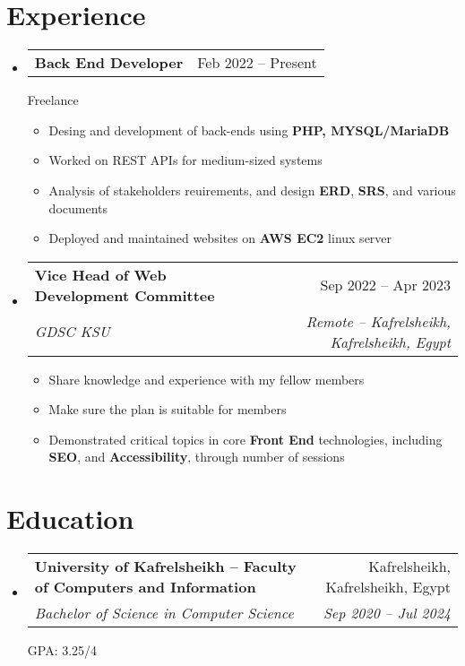 \documentclass[a4paper,11pt]{article}
\makeatletter
\newcommand{\resumeItem}[1]{
  \item\small{#1}
}
\newcommand{\resumeItemListStart}{\begin{itemize}[rightmargin=0.11in]}
\newcommand{\resumeItemListEnd}{\end{itemize}}
\newcommand{\resumeQuadHeading}[4]{
  \item
  \begin{tabular*}{0.96\textwidth}[t]{l@{\extracolsep{\fill}}r}
    \textbf{#1} & #2 \\
    \textit{\small#3} & \textit{\small #4} \\
  \end{tabular*}
}
\newcommand{\resumeQuadHeadingChild}[2]{
  \item
  \begin{tabular*}{0.96\textwidth}[t]{l@{\extracolsep{\fill}}r}
    \textbf{\small#1} & {\small#2} \\
  \end{tabular*}
}
\newcommand{\resumeHeadingListStart}{
  \begin{itemize}[leftmargin=0.15in, label={}]
}
\newcommand{\resumeHeadingListEnd}{\end{itemize}}
\makeatother
\begin{document}

\section{Experience}
\resumeHeadingListStart{}
  \resumeQuadHeadingChild{Back End Developer}{Feb 2022 -- Present}
  {Freelance}
    \resumeItemListStart{}
      \resumeItem{Desing and development of back-ends using \textbf{PHP, MYSQL/MariaDB}}
      \resumeItem{Worked on REST APIs for medium-sized systems}
      \resumeItem{Analysis of stakeholders reuirements, and design \textbf{ERD}, \textbf{SRS}, and various documents}
      \resumeItem{Deployed and maintained websites on \textbf{AWS EC2} linux server}
    \resumeItemListEnd{}

  \resumeQuadHeading{Vice Head of Web Development Committee}{Sep 2022 -- Apr 2023}
  {GDSC KSU}{Remote -- Kafrelsheikh, Kafrelsheikh, Egypt}
    \resumeItemListStart{}
      \resumeItem{Share knowledge and experience with my fellow members}
      \resumeItem{Make sure the plan is suitable for members}
      \resumeItem{Demonstrated critical topics in core \textbf{Front End} technologies, including \textbf{SEO}, and \textbf{Accessibility}, through number of sessions}
    \resumeItemListEnd{}
\resumeHeadingListEnd{}



\section{Education}
  \resumeHeadingListStart{}
    \resumeQuadHeading{University of Kafrelsheikh -- Faculty of Computers and Information}{Kafrelsheikh, Kafrelsheikh, Egypt}
    {Bachelor of Science in Computer Science}{Sep 2020 -- Jul 2024}
    {GPA: 3.25/4}
  \resumeHeadingListEnd{}


\end{document}

